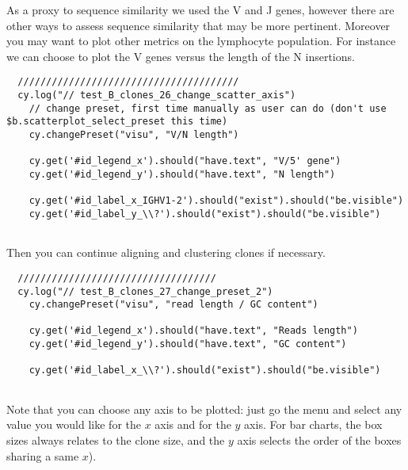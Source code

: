 As a proxy to sequence similarity we used the V and J genes, however there are
other ways to assess sequence similarity that may be more pertinent.
Moreover you may want to plot other metrics on the lymphocyte population.
%
For instance we can choose to plot the V genes versus the length of the N
insertions.
\begin{verbatim}
  ///////////////////////////////////////
  cy.log("// test_B_clones_26_change_scatter_axis")
    // change preset, first time manually as user can do (don't use $b.scatterplot_select_preset this time)
    cy.changePreset("visu", "V/N length")

    cy.get('#id_legend_x').should("have.text", "V/5' gene")
    cy.get('#id_legend_y').should("have.text", "N length")

    cy.get('#id_label_x_IGHV1-2').should("exist").should("be.visible")
    cy.get('#id_label_y_\\?').should("exist").should("be.visible")


\end{verbatim}

Then you can continue aligning and clustering clones if necessary.

\begin{verbatim}
  ///////////////////////////////////
  cy.log("// test_B_clones_27_change_preset_2")
    cy.changePreset("visu", "read length / GC content")

    cy.get('#id_legend_x').should("have.text", "Reads length")
    cy.get('#id_legend_y').should("have.text", "GC content")

    cy.get('#id_label_x_\\?').should("exist").should("be.visible")


\end{verbatim}

Note that you can choose any axis to be plotted: just go the  menu and
select any value you would like for the $x$ axis and for the $y$ axis.
For bar charts, the box sizes always relates to the clone size,
and the $y$ axis selects the order of the boxes sharing a same $x$).


